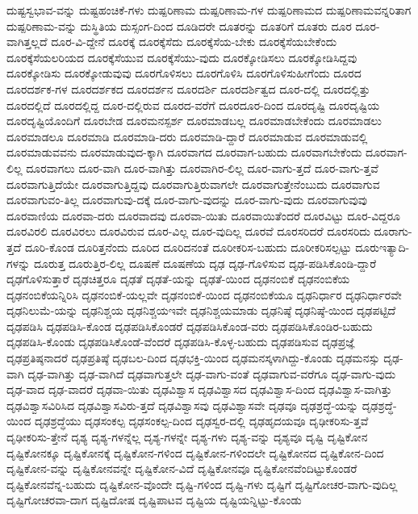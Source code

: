 {ದುಷ್ಟಸ್ವಭಾವ-ವನ್ನು
ದುಷ್ಟಹಂಚಿಕೆ-ಗಳು
ದುಷ್ಪರಿಣಾಮ
ದುಷ್ಪರಿಣಾಮ-ಗಳ
ದುಷ್ಪರಿಣಾಮದ
ದುಷ್ಪರಿಣಾಮವನ್ನರಿತಾಗ
ದುಷ್ಪರಿಣಾಮ-ವನ್ನು
ದುಸ್ಥಿತಿಯ
ದುಸ್ಸಂಗ-ದಿಂದ
ದೂಡಿದರೇ
ದೂತರನ್ನು
ದೂತರಿಗೆ
ದೂತರು
ದೂರ
ದೂರ-ವಾಗಿತ್ತಲ್ಲದೆ
ದೂರ-ವಿ-ದ್ದೇನೆ
ದೂರಕ್ಕೆ
ದೂರಕ್ಕೆಸೆದು
ದೂರಕ್ಕೆಸೆಯ-ಬೇಕು
ದೂರಕ್ಕೆಸೆಯಬೇಕೆಂದು
ದೂರಕ್ಕೆಸೆಯಲರಿಯದ
ದೂರಕ್ಕೆಸೆಯುವ
ದೂರಕ್ಕೆಸೆಯು-ವುದು
ದೂರಕ್ಕೋಡಿಸಲು
ದೂರಕ್ಕೋಡಿಸಿದ್ದವು
ದೂರಕ್ಕೋಡಿಸು
ದೂರಕ್ಕೋಡುವುವು
ದೂರಗೊಳಿಸಲು
ದೂರಗೊಳಿಸಿ
ದೂರಗೊಳಿಸುಹೀಗೆಂದು
ದೂರದ
ದೂರದರ್ಶಕ-ಗಳ
ದೂರದರ್ಶಕದ
ದೂರದರ್ಶನ
ದೂರದರ್ಶಿ
ದೂರದರ್ಶಿತ್ವದ
ದೂರ-ದಲ್ಲಿ
ದೂರದಲ್ಲಿತ್ತು
ದೂರದಲ್ಲಿದೆ
ದೂರದಲ್ಲಿದ್ದ
ದೂರ-ದಲ್ಲಿರುವ
ದೂರದ-ವರೆಗೆ
ದೂರದೂರ-ದಿಂದ
ದೂರದೃಷ್ಟಿ
ದೂರದೃಷ್ಟಿಯ
ದೂರದೃಷ್ಟಿಯೊಂದಿಗೆ
ದೂರಬೇಡ
ದೂರಮನಸ್ಪರ್ಶ
ದೂರಮಾಡಬಲ್ಲ
ದೂರಮಾಡಬೇಕೆಂದು
ದೂರಮಾಡಲು
ದೂರಮಾಡಲೂ
ದೂರಮಾಡಿ
ದೂರಮಾಡಿ-ದರು
ದೂರಮಾಡಿ-ದ್ದಾರೆ
ದೂರಮಾಡುವ
ದೂರಮಾಡುವಲ್ಲಿ
ದೂರಮಾಡುವವನು
ದೂರಮಾಡುವುದ-ಕ್ಕಾಗಿ
ದೂರವಾಗದ
ದೂರವಾಗ-ಬಹುದು
ದೂರವಾಗಬೇಕೆಂದು
ದೂರವಾಗ-ಲಿಲ್ಲ
ದೂರವಾಗಲು
ದೂರ-ವಾಗಿ
ದೂರ-ವಾಗಿತ್ತು
ದೂರವಾಗಿರ-ಲಿಲ್ಲ
ದೂರ-ವಾಗು-ತ್ತದೆ
ದೂರ-ವಾಗು-ತ್ತವೆ
ದೂರವಾಗುತ್ತಿದೆಯೇ
ದೂರವಾಗುತ್ತಿದ್ದವು
ದೂರವಾಗುತ್ತಿರುವಾಗಲೇ
ದೂರವಾಗುತ್ತೇನೆಂಬುದು
ದೂರವಾಗುವ
ದೂರವಾಗುವಂ-ತಿಲ್ಲ
ದೂರವಾಗುವು-ದಕ್ಕೆ
ದೂರ-ವಾಗು-ವುದನ್ನು
ದೂರ-ವಾಗು-ವುದು
ದೂರವಾಗುವುವು
ದೂರವಾಣಿಯ
ದೂರವಾ-ದರು
ದೂರವಾದವು
ದೂರವಾ-ಯಿತು
ದೂರವಾಯಿತೆಂದರೆ
ದೂರವಿಟ್ಟು
ದೂರ-ವಿದ್ದರೂ
ದೂರವಿರಲಿ
ದೂರವಿರಲು
ದೂರವಿರುವ
ದೂರ-ವಿಲ್ಲ
ದೂರ-ವುದಿಲ್ಲ
ದೂರವೆ
ದೂರಸರಿದರೆ
ದೂರಸರಿದು
ದೂರಾಗು-ತ್ತದೆ
ದೂರಿ-ಕೊಂಡ
ದೂರಿತ್ತನೆಂದು
ದೂರಿದ
ದೂರಿದನಂತೆ
ದೂರೀಕರಿಸ-ಬಹುದು
ದೂರೀಕರಿಸಲ್ಪಟ್ಟು
ದೂರುಇತ್ಯಾದಿ-ಗಳನ್ನು
ದೂರುತ್ತ
ದೂರುತ್ತಿರ-ಲಿಲ್ಲ
ದೂಷಣೆ
ದೂಷಣೆಯ
ದೃಢ
ದೃಢ-ಗೊಳಿಸುವ
ದೃಢ-ಪಡಿಸಿಕೊಂಡಿ-ದ್ದಾರೆ
ದೃಢಗೊಳಿಸುತ್ತಾರೆ
ದೃಢಚಿತ್ತರೂ
ದೃಢತೆ
ದೃಢತೆ-ಯನ್ನು
ದೃಢತೆ-ಯಿಂದ
ದೃಢನಂಬಿಕೆ
ದೃಢನಂಬಿಕೆಯ
ದೃಢನಂಬಿಕೆಯನ್ನಿರಿಸಿ
ದೃಢನಂಬಿಕೆ-ಯಲ್ಲವೇ
ದೃಢನಂಬಿಕೆ-ಯಿಂದ
ದೃಢನಂಬಿಕೆಯೂ
ದೃಢನಿರ್ಧಾರ
ದೃಢನಿರ್ಧಾರವೇ
ದೃಢನಿಲುಮೆ-ಯನ್ನು
ದೃಢನಿಶ್ಚಯ
ದೃಢನಿಶ್ಚಯಇವೇ
ದೃಢನಿಶ್ಚಯಮಾಡು
ದೃಢನಿಷ್ಠೆ
ದೃಢನಿಷ್ಠೆ-ಯಿಂದ
ದೃಢಪಟ್ಟಿದೆ
ದೃಢಪಡಿಸಿ
ದೃಢಪಡಿಸಿ-ಕೊಂಡ
ದೃಢಪಡಿಸಿಕೊಂಡರೆ
ದೃಢಪಡಿಸಿಕೊಂಡ-ವರು
ದೃಢಪಡಿಸಿಕೊಂಡಿರ-ಬಹುದು
ದೃಢಪಡಿಸಿ-ಕೊಂಡು
ದೃಢಪಡಿಸಿಕೊಂಡೆ-ವೆಂದರೆ
ದೃಢಪಡಿಸಿ-ಕೊಳ್ಳ-ಬಹುದು
ದೃಢಪಡಿಸುವ
ದೃಢಪ್ರಜ್ಞೆ
ದೃಢಪ್ರತಿಷ್ಠನಾದರೆ
ದೃಢಪ್ರತಿಷ್ಠೆ
ದೃಢಬಲ-ದಿಂದ
ದೃಢಭಕ್ತಿ-ಯಿಂದ
ದೃಢಮನಸ್ಕಳಾಗಿದ್ದು-ಕೊಂಡು
ದೃಢಮನಸ್ಸು
ದೃಢ-ವಾಗಿ
ದೃಢ-ವಾಗಿತ್ತು
ದೃಢ-ವಾಗಿದೆ
ದೃಢವಾಗುತ್ತಲೇ
ದೃಢ-ವಾಗು-ವಂತೆ
ದೃಢವಾಗುವ-ವರೆಗೂ
ದೃಢ-ವಾಗು-ವುದು
ದೃಢ-ವಾದ
ದೃಢ-ವಾದರೆ
ದೃಢವಾ-ಯಿತು
ದೃಢವಿಶ್ವಾಸ
ದೃಢವಿಶ್ವಾಸದ
ದೃಢವಿಶ್ವಾಸ-ದಿಂದ
ದೃಢವಿಶ್ವಾಸ-ವಾಗಿತ್ತು
ದೃಢವಿಶ್ವಾಸವಿರಿಸಿದ
ದೃಢವಿಶ್ವಾಸವಿರು-ತ್ತದೆ
ದೃಢವಿಶ್ವಾಸವು
ದೃಢವಿಶ್ವಾಸವೇ
ದೃಢವೂ
ದೃಢಶ್ರದ್ಧೆ-ಯನ್ನು
ದೃಢಶ್ರದ್ಧೆ-ಯಿಂದ
ದೃಢಶ್ರದ್ಧೆಯು
ದೃಢಸಂಕಲ್ಪ
ದೃಢಸಂಕಲ್ಪ-ದಿಂದ
ದೃಢಸ್ವರ-ದಲ್ಲಿ
ದೃಢಹೃದಯವೂ
ದೃಢೀಕರಿಸು-ತ್ತವೆ
ದೃಢೀಕರಿಸು-ತ್ತೇನೆ
ದೃಶ್ಯ
ದೃಶ್ಯ-ಗಳನ್ನೆಲ್ಲ
ದೃಶ್ಯ-ಗಳನ್ನೇ
ದೃಶ್ಯ-ಗಳು
ದೃಶ್ಯ-ವನ್ನು
ದೃಶ್ಯವೂ
ದೃಷ್ಟಿ
ದೃಷ್ಟಿಕೋನ
ದೃಷ್ಟಿಕೋನಕ್ಕೂ
ದೃಷ್ಟಿಕೋನಕ್ಕೆ
ದೃಷ್ಟಿಕೋನ-ಗಳಿಂದ
ದೃಷ್ಟಿಕೋನ-ಗಳಿಂದಲೇ
ದೃಷ್ಟಿಕೋನದ
ದೃಷ್ಟಿಕೋನ-ದಿಂದ
ದೃಷ್ಟಿಕೋನ-ವನ್ನು
ದೃಷ್ಟಿಕೋನವನ್ನೇ
ದೃಷ್ಟಿಕೋನ-ವಿದೆ
ದೃಷ್ಟಿಕೋನವೂ
ದೃಷ್ಟಿಕೋನವೆಂದಿಟ್ಟುಕೊಂಡರೆ
ದೃಷ್ಟಿಕೋನವೆನ್ನ-ಬಹುದು
ದೃಷ್ಟಿಕೋನ-ವೊಂದೇ
ದೃಷ್ಟಿ-ಗಳಿಂದ
ದೃಷ್ಟಿ-ಗಳು
ದೃಷ್ಟಿಗೆ
ದೃಷ್ಟಿಗೋಚರ-ವಾಗು-ವುದಿಲ್ಲ
ದೃಷ್ಟಿಗೋಚರವಾ-ದಾಗ
ದೃಷ್ಟಿದೋಷ
ದೃಷ್ಟಿಪಾಟವ
ದೃಷ್ಟಿಯ
ದೃಷ್ಟಿಯನ್ನಿಟ್ಟು-ಕೊಂಡು
}
